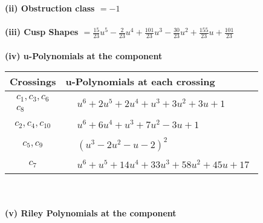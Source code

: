 \documentclass[1p]{elsarticle_modified}
\theoremstyle{definition}
\begin{document}
\flushleft \textbf{(ii) Obstruction class $= -1$}\\~\\
\flushleft \textbf{(iii) Cusp Shapes $= \frac{15}{23} u^5-\frac{2}{23} u^4+\frac{101}{23} u^3-\frac{30}{23} u^2+\frac{155}{23} u+\frac{101}{23}$}\\~\\
\newpage\renewcommand{\arraystretch}{1}
\flushleft \textbf{(iv) u-Polynomials at the component}\newline \\
\begin{tabular}{m{50pt}|m{274pt}}
Crossings & \hspace{64pt}u-Polynomials at each crossing \\
\hline $$\begin{aligned}c_{1},c_{3},c_{6}\\c_{8}\end{aligned}$$&$\begin{aligned}
&u^6+2 u^5+2 u^4+u^3+3 u^2+3 u+1
\end{aligned}$\\
\hline $$\begin{aligned}c_{2},c_{4},c_{10}\end{aligned}$$&$\begin{aligned}
&u^6+6 u^4+u^3+7 u^2-3 u+1
\end{aligned}$\\
\hline $$\begin{aligned}c_{5},c_{9}\end{aligned}$$&$\begin{aligned}
&(u^3-2 u^2- u-2)^2
\end{aligned}$\\
\hline $$\begin{aligned}c_{7}\end{aligned}$$&$\begin{aligned}
&u^6+u^5+14 u^4+33 u^3+58 u^2+45 u+17
\end{aligned}$\\
\hline
\end{tabular}\\~\\
\newpage\renewcommand{\arraystretch}{1}
\flushleft \textbf{(v) Riley Polynomials at the component}\newline \\
\end{document}

